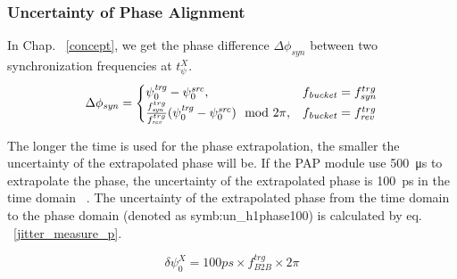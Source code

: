 \subsubsection{Uncertainty of Phase Alignment}

In Chap. ~\ref{concept}, we get the phase difference $\Delta \phi_\mathit{syn}$ between two synchronization frequencies at $t_\psi^X$.
\begin{eqnarray}\label{phase_syn}
\Delta \phi_\mathit{syn}=
\begin{cases}
\psi^\mathit{trg}_0-\psi^\mathit{src}_0, &f_{\mathit{bucket}}=f_{\mathit{syn}}^{trg}\cr
\frac{f_{\mathit{syn}}^{trg}}{f_{\mathit{rev}}^{trg}}(\psi^\mathit{trg}_0-\psi^\mathit{src}_0) \mod 2\pi, &f_{\mathit{bucket}}=f_{\mathit{rev}}^{trg}\cr
\end{cases}
\end{eqnarray}

The longer the time is used for the phase extrapolation, the smaller the uncertainty of the extrapolated phase will be. If the PAP module use \SI{500}{\micro\second} to extrapolate the phase, the uncertainty of the extrapolated phase is \SI{100}{ps} in the time domain ~\cite{ferrand_development_????}. The uncertainty of the extrapolated phase from the time domain to the phase domain (denoted as \gls{symb:un_h1phase100}) is calculated by eq. ~\ref{jitter_measure_p}.

\begin{equation} 
\delta \psi^{X}_0=100ps \times f_\mathit{B2B}^\mathit{trg} \times {2\pi}
\label{jitter_measure_p}
\end{equation}



